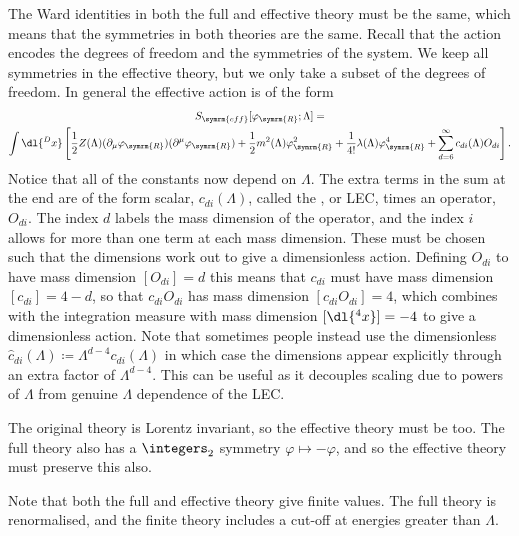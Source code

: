 \documentclass[fleqn]{NotesClass}
\newcommand{\renormalised}{\symrm{R}}
\newcommand{\eff}{\symrm{eff}}
\begin{document}
    The Ward identities in both the full and effective theory must be the same, which means that the symmetries in both theories are the same.
    Recall that the action encodes the degrees of freedom and the symmetries of the system.
    We keep all symmetries in the effective theory, but we only take a subset of the degrees of freedom.
    In general the effective action is of the form
    \begin{gather}
        S_{\eff}[\varphi_{\renormalised}; \Lambda] =\\
        \int \dl{^Dx} \left[ \frac{1}{2}Z(\Lambda)(\partial_\mu \varphi_{\renormalised}) (\partial^\mu \varphi_{\renormalised}) + \frac{1}{2}m^2(\Lambda) \varphi_{\renormalised}^2 + \frac{1}{4!}\lambda(\Lambda)\varphi_{\renormalised}^4 + \sum_{d=6}^{\infty} c_{di}(\Lambda) O_{di} \right]. \notag
    \end{gather}
    Notice that all of the constants now depend on \(\Lambda\).
    The extra terms in the sum at the end are of the form scalar, \(c_{di}(\Lambda)\), called the , or LEC, times an operator, \(O_{di}\).
    The index \(d\) labels the mass dimension of the operator, and the index \(i\) allows for more than one term at each mass dimension.
    These must be chosen such that the dimensions work out to give a dimensionless action.
    Defining \(O_{di}\) to have mass dimension \([O_{di}] = d\) this means that \(c_{di}\) must have mass dimension \([c_{di}] = 4 - d\), so that \(c_{di}O_{di}\) has mass dimension \([c_{di}O_{di}] = 4\), which combines with the integration measure with mass dimension \([\dl{^4x}] = -4\) to give a dimensionless action.
    Note that sometimes people instead use the dimensionless \(\hat{c}_{di}(\Lambda) \coloneqq \Lambda^{d-4}c_{di}(\Lambda)\) in which case the dimensions appear explicitly through an extra factor of \(\Lambda^{d - 4}\).
    This can be useful as it decouples scaling due to powers of \(\Lambda\) from genuine \(\Lambda\) dependence of the LEC.
    
    The original theory is Lorentz invariant, so the effective theory must be too.
    The full theory also has a \(\integers_2\) symmetry \(\varphi \mapsto -\varphi\), and so the effective theory must preserve this also.
    
    Note that both the full and effective theory give finite values.
    The full theory is renormalised, and the finite theory includes a cut-off at energies greater than \(\Lambda\).
    
\end{document}
